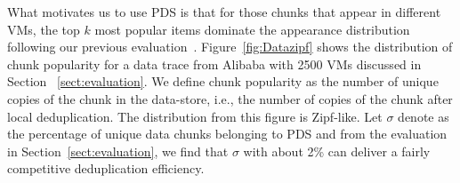 What  motivates us to use PDS
is that for those chunks that appear in different VMs, the top $k$ most popular items
dominate the appearance distribution following our previous evaluation~\cite{WeiZhangIEEE}.  
Figure~\ref{fig:Datazipf} shows the distribution of chunk popularity for a data trace 
from Alibaba with 2500 VMs discussed in Section ~\ref{sect:evaluation}.
We define chunk popularity as the number of unique copies of the chunk in the data-store,
i.e., the number of copies of the chunk after local deduplication.
The distribution from this figure is Zipf-like. 
Let  $\sigma$ denote as the percentage of unique data chunks belonging to PDS and 
from the evaluation in Section~\ref{sect:evaluation}, we find that
$\sigma$ with about  2\% can deliver a fairly competitive deduplication efficiency.

